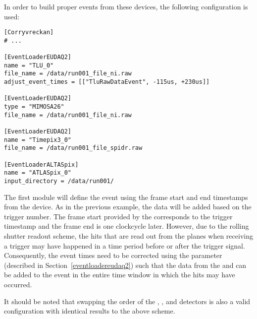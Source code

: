 In order to build proper events from these devices, the following configuration is used:

\begin{verbatim}
[Corryvreckan]
# ...

[EventLoaderEUDAQ2]
name = "TLU_0"
file_name = /data/run001_file_ni.raw
adjust_event_times = [["TluRawDataEvent", -115us, +230us]]

[EventLoaderEUDAQ2]
type = "MIMOSA26"
file_name = /data/run001_file_ni.raw

[EventLoaderEUDAQ2]
name = "Timepix3_0"
file_name = /data/run001_file_spidr.raw

[EventLoaderALTASpix]
name = "ATLASpix_0"
input_directory = /data/run001/
\end{verbatim}

The first module will define the event using the frame start and end timestamps from the  device.
As in the previous example, the  data will be added based on the trigger number.
The frame start provided by the  corresponds to the trigger timestamp and the frame end is one clockcycle later.
However, due to the rolling shutter readout scheme, the hits that are read out from the  planes when receiving a trigger may have happened in a time period before or after the trigger signal.
Consequently, the event times need to be corrected using the  parameter (described in Section~\ref{eventloadereudaq2}) such that the data from the  and  can be added to the event in the entire time window in which the  hits may have occurred.

It should be noted that swapping the order of the , , and  detectors is also a valid configuration with identical results to the above scheme.
